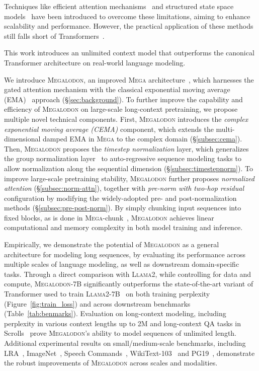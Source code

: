 Techniques like efficient attention mechanisms~\citep{tay2020efficient,ma2021luna} and structured state space models~\citep{gu2022efficiently,poli2023hyena,gu2023mamba} have been introduced to overcome these limitations, aiming to enhance scalability and performance. However, the practical application of these methods still falls short of Transformers~\citep{tay2022scaling,gu2023mamba}. 

This work introduces an unlimited context model that outperforms the canonical Transformer architecture on real-world language modeling.

We introduce \textsc{Megalodon}, an improved \textsc{Mega} architecture~\citep{ma2023mega}, which harnesses the gated attention mechanism with the classical exponential moving average (EMA)~\citep{hunter1986exponentially} approach (\S\ref{sec:background}).
To further improve the capability and efficiency of \textsc{Megalodon} on large-scale long-context pretraining, we propose multiple novel technical components. First, \textsc{Megalodon} introduces the \emph{complex exponential moving average (CEMA)} component, which extends the multi-dimensional damped EMA in \textsc{Mega} to the complex domain (\S\ref{subsec:cema}).
Then, \textsc{Megalodon} proposes the \emph{timestep normalization} layer, which generalizes the group normalization layer~\citep{wu2018group} to auto-regressive sequence modeling tasks to allow normalization along the sequential dimension (\S\ref{subsec:timestepnorm}).
To improve large-scale pretraining stability, \textsc{Megalodon} further proposes \emph{normalized attention} (\S\ref{subsec:norm-attn}), together with \emph{pre-norm with two-hop residual} configuration by modifying the widely-adopted pre- and post-normalization methods (\S\ref{subsec:pre-post-norm}).
By simply chunking input sequences into fixed blocks, as is done in  \textsc{Mega}-chunk~\citep{ma2023mega}, \textsc{Megalodon} achieves linear computational and memory complexity in both model training and inference.

Empirically, we demonstrate the potential of \textsc{Megalodon} as a general architecture for modeling long sequences, by evaluating its performance across multiple scales of language modeling, as well as downstream domain-specific tasks. Through a direct comparison with \textsc{Llama2}, while controlling for data and compute, \textsc{Megalodon}-7B significantly outperforms the state-of-the-art variant of Transformer used to train \textsc{Llama2}-7B~\citep{touvron2023llama} on both training perplexity (Figure~\ref{fig:train_loss}) and across downstream benchmarks (Table~\ref{tab:benmarks}).
Evaluation on long-context modeling, including perplexity in various context lengths up to 2M and long-context QA tasks in Scrolls~\citep{parisotto2020stabilizing} prove \textsc{Megalodon}'s ability to model sequences of unlimited length. Additional experimental results on small/medium-scale benchmarks, including LRA~\citep{tay2021long}, ImageNet~\citep{deng2009imagenet}, Speech Commands~\citep{warden2018speech}, WikiText-103~\citep{merity2017pointer} and PG19~\citep{raecompressive2019}, demonstrate the robust improvements of \textsc{Megalodon} across scales and modalities.

